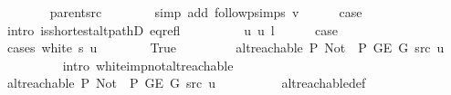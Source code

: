 \begin{isabellebody}
\ \ \ \ \ \ \isamarkupfalse%
\ parent{\isacharunderscore}{\kern0pt}src\isanewline
\ \ \ \ \ \ \isamarkupfalse%
\ {\isacharparenleft}{\kern0pt}simp\ add{\isacharcolon}{\kern0pt}\ follow{\isacharunderscore}{\kern0pt}psimps\ v{\isacharparenright}{\kern0pt}\isanewline
\ \ \ \ \isamarkupfalse%
\ {\isacharquery}{\kern0pt}case\isanewline
\ \ \ \ \ \ \isamarkupfalse%
\ {\isacharparenleft}{\kern0pt}intro\ is{\isacharunderscore}{\kern0pt}shortest{\isacharunderscore}{\kern0pt}alt{\isacharunderscore}{\kern0pt}pathD{\isacharparenleft}{\kern0pt}{}{\isacharparenright}{\kern0pt}\ eq{\isacharunderscore}{\kern0pt}refl{\isacharparenright}{\kern0pt}\isanewline
\ \ \isamarkupfalse%
\isanewline
\ \ \ \ \isamarkupfalse%
\ {\isacharparenleft}{\kern0pt}{}\ u\ u{\isacharprime}{\kern0pt}\ l{\isacharparenright}{\kern0pt}\isanewline
\ \ \ \ \isamarkupfalse%
\ {\isacharquery}{\kern0pt}case\isanewline
\ \ \ \ \isamarkupfalse%
\ {\isacharparenleft}{\kern0pt}cases\ {\isachardoublequoteopen}white\ s\ u{\isachardoublequoteclose}{\isacharparenright}{\kern0pt}\isanewline
\ \ \ \ \ \ \isamarkupfalse%
\ True\isanewline
\ \ \ \ \ \ \isamarkupfalse%
\ {\isachardoublequoteopen}{\isasymnot}\ alt{\isacharunderscore}{\kern0pt}reachable\ P{\isacharprime}{\kern0pt}{\isacharprime}{\kern0pt}\ {\isacharparenleft}{\kern0pt}Not\ {\isasymcirc}\ P{\isacharprime}{\kern0pt}{\isacharprime}{\kern0pt}{\isacharparenright}{\kern0pt}\ {\isacharparenleft}{\kern0pt}G{\isachardot}{\kern0pt}E\ G{\isacharparenright}{\kern0pt}\ src\ u{\isachardoublequoteclose}\isanewline
\ \ \ \ \ \ \ \ \isamarkupfalse%
\ {\isacharparenleft}{\kern0pt}intro\ white{\isacharunderscore}{\kern0pt}imp{\isacharunderscore}{\kern0pt}not{\isacharunderscore}{\kern0pt}alt{\isacharunderscore}{\kern0pt}reachable{\isacharparenright}{\kern0pt}\isanewline
\ \ \ \ \ \ \isamarkupfalse%
\ \isamarkupfalse%
\ {\isachardoublequoteopen}alt{\isacharunderscore}{\kern0pt}reachable\ P{\isacharprime}{\kern0pt}{\isacharprime}{\kern0pt}\ {\isacharparenleft}{\kern0pt}Not\ {\isasymcirc}\ P{\isacharprime}{\kern0pt}{\isacharprime}{\kern0pt}{\isacharparenright}{\kern0pt}\ {\isacharparenleft}{\kern0pt}G{\isachardot}{\kern0pt}E\ G{\isacharparenright}{\kern0pt}\ src\ u{\isachardoublequoteclose}\isanewline
\ \ \ \ \ \ \ \ \isamarkupfalse%
\ alt{\isacharunderscore}{\kern0pt}reachable{\isacharunderscore}{\kern0pt}def\isanewline

\end{isabellebody}
